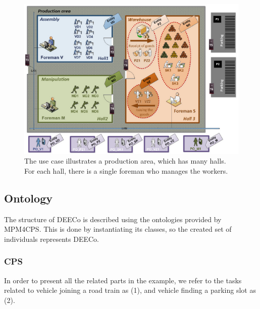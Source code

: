   
 \begin{figure}[!htb]
\centering
\includegraphics[scale=0.70]{figures/shifts}
\caption{The use case illustrates a production area, which has many halls. For each hall, there is a single foreman who manages the workers.}
\label{fig:shifts}
\end{figure}
 
\subsection{Ontology}
 The structure of DEECo is described using the ontologies provided by MPM4CPS. This is done by instantiating its classes, so the created set of individuals represents DEECo.
 
 \subsubsection{CPS}
In order to present all the related parts in the example, we refer to the tasks related to vehicle joining a road train as (1), and vehicle finding a parking slot as (2).

